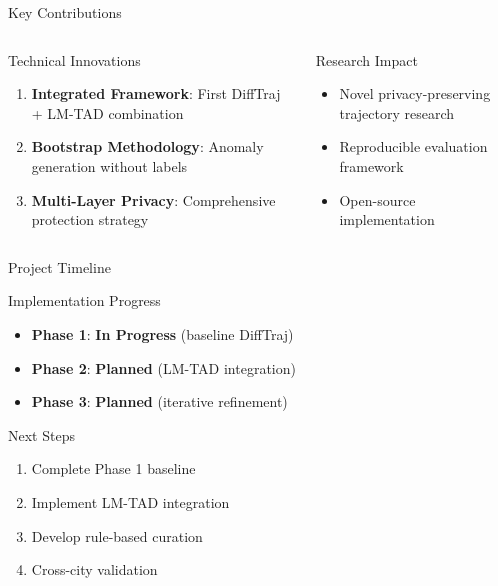 \documentclass[aspectratio=169,xcolor={dvipsnames}]{beamer}
\newcommand{\phase}[1]{\textcolor{ScienceBlue}{\textbf{Phase #1}}}
\begin{document}
\begin{frame}{Key Contributions}
  \begin{columns}
    \begin{column}{0.5\textwidth}
      \begin{block}{Technical Innovations}
        \begin{enumerate}
          \item \textbf{Integrated Framework}: First DiffTraj + LM-TAD combination
          \item \textbf{Bootstrap Methodology}: Anomaly generation without labels
          \item \textbf{Multi-Layer Privacy}: Comprehensive protection strategy
        \end{enumerate}
      \end{block}
    \end{column}
    \begin{column}{0.5\textwidth}
      \begin{block}{Research Impact}
        \begin{itemize}
          \item Novel privacy-preserving trajectory research
          \item Reproducible evaluation framework
          \item Open-source implementation
        \end{itemize}
      \end{block}
    \end{column}
  \end{columns}
\end{frame}

\begin{frame}{Project Timeline}
  \begin{block}{Implementation Progress}
    \begin{itemize}
      \item \phase{1}: \textcolor{AbsoluteZero}{\textbf{In Progress}} (baseline DiffTraj)
      \item \phase{2}: \textbf{Planned} (LM-TAD integration)
      \item \phase{3}: \textbf{Planned} (iterative refinement)
    \end{itemize}
  \end{block}
  
  \vspace{1em}
  \begin{block}{Next Steps}
    \begin{enumerate}
      \item Complete Phase 1 baseline
      \item Implement LM-TAD integration
      \item Develop rule-based curation
      \item Cross-city validation
    \end{enumerate}
  \end{block}
\end{frame}
\end{document}
